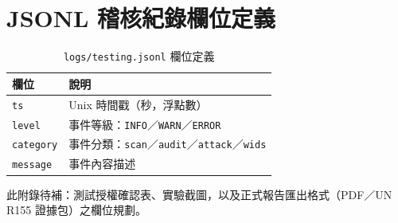 \documentclass[12pt,a4paper,oneside]{report}
\begin{document}
\section{JSONL 稽核紀錄欄位定義}
\begin{longtable}{p{}p{}}
\caption{\texttt{logs/testing.jsonl} 欄位定義}\\
\toprule
欄位 & 說明 \\
\midrule
\texttt{ts} & Unix 時間戳（秒，浮點數） \\
\texttt{level} & 事件等級：\texttt{INFO}／\texttt{WARN}／\texttt{ERROR} \\
\texttt{category} & 事件分類：\texttt{scan}／\texttt{audit}／\texttt{attack}／\texttt{wids} \\
\texttt{message} & 事件內容描述 \\
\bottomrule
\end{longtable}

此附錄待補：測試授權確認表、實驗截圖，以及正式報告匯出格式（PDF／UN R155 證據包）之欄位規劃。
\end{document}
